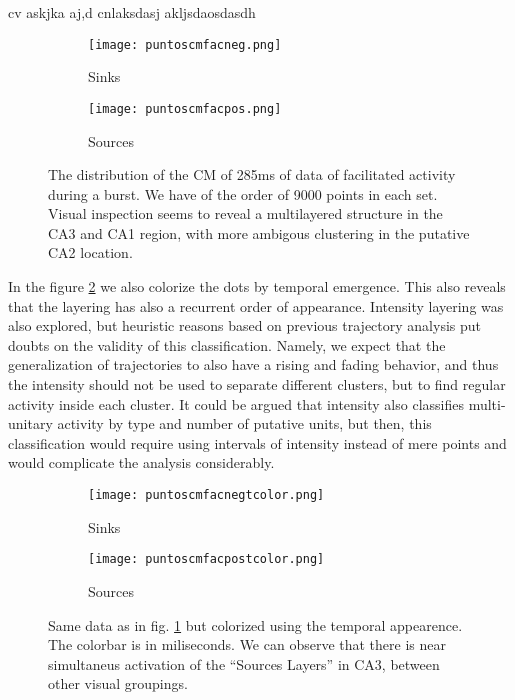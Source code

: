 \documentclass{article}
\begin{document}
cv askjka aj,d cnlaksdasj akljsdaosdasdh 


\begin{figure}
\centering
\begin{subfigure}{0.40\textwidth}
\texttt{[image: puntoscmfacneg.png]}
\caption{Sinks}
\end{subfigure}
\begin{subfigure}{0.40\textwidth}
\texttt{[image: puntoscmfacpos.png]}
\caption{Sources}
\end{subfigure}

\caption{The distribution of the CM of 285ms of data of facilitated activity
during a burst. We have of the order of 9000 points in each
set. Visual inspection seems to reveal a multilayered structure in the
CA3 and CA1 region, with more ambigous clustering in the putative
CA2 location.}\label{puntostodos}

\end{figure}

In the figure \ref{puntosconcolor} we also colorize the dots by temporal emergence.
This also reveals that the layering has also a recurrent order of appearance. Intensity
layering was also explored, but heuristic reasons based on previous trajectory
analysis put doubts on the validity of this classification. Namely, we expect
that the generalization of trajectories to also have a rising and fading behavior,
and thus the intensity should not be used to separate different clusters, but to
find regular activity inside each cluster. It could be argued that intensity also
classifies multi-unitary activity by type and number of putative units, but then,
this classification would require using intervals of intensity instead of mere
points and would complicate the analysis considerably.


\begin{figure}
\centering
\begin{subfigure}{0.40\textwidth}
\texttt{[image: puntoscmfacnegtcolor.png]}
\caption{Sinks}
\end{subfigure}
\begin{subfigure}{0.40\textwidth}
\texttt{[image: puntoscmfacpostcolor.png]}
\caption{Sources}
\end{subfigure}

\caption{Same data as in fig. \ref{puntostodos} but colorized using
the temporal appearence. The colorbar is in miliseconds. We can observe
that there is near simultaneus activation of the ``Sources Layers'' in CA3,
between other visual groupings. 
}\label{puntosconcolor}

\end{figure}
\end{document}
